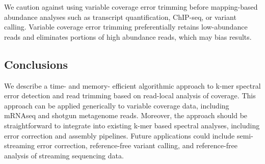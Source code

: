\documentclass{article}
\begin{document}
We caution against using variable coverage error trimming before
mapping-based abundance analyses such as transcript quantification,
ChIP-seq, or variant calling.  Variable coverage error trimming
preferentially retains low-abundance reads and eliminates portions of
high abundance reads, which may bias results.

\subsection{Conclusions}

We describe a time- and memory- efficient algorithmic approach to
k-mer spectral error detection and read trimming based on read-local
analysis of coverage.  This approach can be applied generically to
variable coverage data, including mRNAseq and shotgun metagenome
reads.  Moreover, the approach should be straightforward to integrate
into existing k-mer based spectral analyses, including error
correction and assembly pipelines.  Future applications could include
semi-streaming error correction, reference-free variant calling, and
reference-free analysis of streaming sequencing data.



\end{document}
